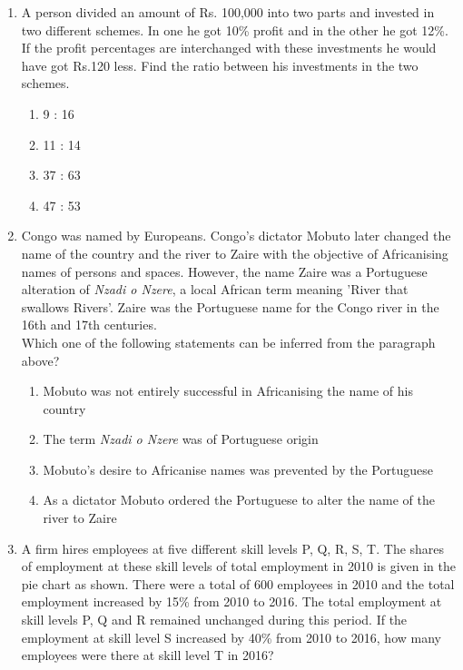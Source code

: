 \documentclass[journal,12pt,onecolumn]{IEEEtran}
\theoremstyle{remark}
\begin{document}
\begin{enumerate}
\item A person divided an amount of Rs. 100,000 into two parts and invested in two different schemes. In one he got 10\% profit and in the other he got 12\%. If the profit percentages are interchanged with these investments he would have got Rs.120 less. Find the ratio between his investments in the two schemes.  \hfill{}
\begin{multicols}{4}
\begin{enumerate}
    \item 9 : 16
    \item 11 : 14
    \item 37 : 63
    \item 47 : 53
\end{enumerate}
\end{multicols}

\item Congo was named by Europeans. Congo's dictator Mobuto later changed the name of the country and the river to Zaire with the objective of Africanising names of persons and spaces. However, the name Zaire was a Portuguese alteration of \textit{Nzadi o Nzere}, a local African term meaning 'River that swallows Rivers'. Zaire was the Portuguese name for the Congo river in the 16th and 17th centuries.\\
Which one of the following statements can be inferred from the paragraph above?  \hfill{}

\begin{enumerate}
    \item Mobuto was not entirely successful in Africanising the name of his country
    \item The term \textit{Nzadi o Nzere} was of Portuguese origin
    \item Mobuto's desire to Africanise names was prevented by the Portuguese
    \item As a dictator Mobuto ordered the Portuguese to alter the name of the river to Zaire
\end{enumerate}



\vspace{2cm}


\item A firm hires employees at five different skill levels P, Q, R, S, T. The shares of employment at these skill levels of total employment in 2010 is given in the pie chart as shown. There were a total of 600 employees in 2010 and the total employment increased by 15\% from 2010 to 2016. The total employment at skill levels P, Q and R remained unchanged during this period. If the employment at skill level S increased by 40\% from 2010 to 2016, how many employees were there at skill level T in 2016? \hfill{}


\end{enumerate}
\end{document}
